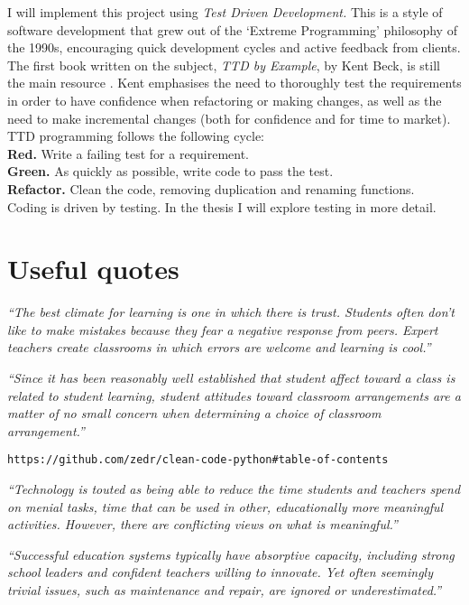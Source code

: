 \documentclass[10pt]{article}
\begin{document}
I will implement this project using \emph{Test Driven Development.} This is a style of software development that grew out of the `Extreme Programming' philosophy of the 1990s, encouraging quick development cycles and active feedback from clients. The first book written on the subject, \emph{TTD by Example}, by Kent Beck, is still the main resource \cite{Beck03}. Kent emphasises the need to thoroughly test the requirements in order to have confidence when refactoring or making changes, as well as the need to make incremental changes (both for confidence and for time to market). TTD programming follows the following cycle: \\
\indent \textbf{Red.} Write a failing test for a requirement. \\
\indent \textbf{Green.} As quickly as possible, write code to pass the test. \\
\indent \textbf{Refactor.} Clean the code, removing duplication and renaming functions. \\
Coding is driven by testing. In the thesis I will explore testing in more detail.


\section{Useful quotes}
 
\begin{center} 
\emph{``The best climate for learning is one in which there is trust. Students often don’t like to make mistakes because they fear a negative response from peers. Expert teachers create classrooms in which errors are welcome and learning is cool.''} \cite{Hat12}
\end{center}
 
\begin{center} 
\emph{``Since it has been reasonably well established that student affect toward a class is related to student learning, student attitudes toward classroom arrangements are a matter of no small concern when determining a choice of classroom arrangement.''} \cite{MM78}
\end{center}

\begin{verbatim}
https://github.com/zedr/clean-code-python#table-of-contents
\end{verbatim}


\begin{center} 
\emph{``Technology is touted as being able to reduce the time students and teachers spend on menial tasks, time that can be used in other, educationally more meaningful activities. However, there are conflicting views on what is meaningful.''} \cite[p. 11]{Unesco23}
\end{center}

\begin{center} 
\emph{``Successful education systems typically have absorptive capacity, including strong school leaders and confident teachers willing to innovate. Yet often seemingly trivial issues, such as maintenance and repair, are ignored or underestimated.''} \cite[p. 17]{Unesco23}
\end{center}
\end{document}
